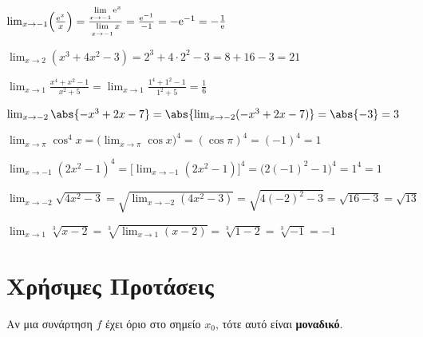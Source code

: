 \begin{example}
  $ \lim_{x \to -1} \Bigl(\frac{\mathrm{e}^{x}}{x}\Bigr) = \frac{\lim\limits_{x \to -1}
  \mathrm{e}^{x}}{\lim\limits_{x \to -1}x} = \frac{\mathrm{e}^{-1}}{-1} = -
  \mathrm{e}^{-1} = - \frac{1}{\mathrm{e}} $  
\end{example}

\begin{example}
  $ \lim_{x \to 2} (x^{3}+4x^{2}-3) = 2^{3}+ 4 \cdot 2^{2} -3 = 8+16-3 = 21 $  
\end{example}

\begin{example}
  $ \lim_{x \to 1} \frac{x^{4}+x^{2}-1}{x^{2}+5} = \lim_{x \to 1}
  \frac{1^{4}+1^{2}-1}{1^{2}+5} = \frac{1}{6} $
\end{example}

\begin{example}
  $ \lim_{x \to -2} \abs{-x^{3}+2x-7} = \abs{\lim_{x \to -2} (-x^{3}+2x-7)} = \abs{-3}
  = 3$ 
\end{example}

\begin{example}
  $ \lim_{x \to \pi} \cos^{4}{x} = \bigl(\lim_{x \to \pi} \cos{x} \bigr)^{4} =
  (\cos{\pi} )^{4} = (-1)^{4}=1 $
\end{example}

\begin{example} 
  $\lim_{x \to -1} (2x^{2}-1)^{4} = \bigl[\lim_{x \to -1}
  (2x^{2}-1)\bigr]^{4} = \bigl(2(-1)^{2}-1\bigr)^{4} = 1^{4} = 1 $ 
\end{example}

\begin{example}
  $ \lim_{x \to -2} \sqrt{4x^{2}-3} = \sqrt{\lim_{x \to -2} (4x^{2}-3)} =
  \sqrt{4(-2)^{2}-3} = \sqrt{16-3} = \sqrt{13} $    
\end{example}

\begin{example}
  $ \lim_{x \to 1} \sqrt[3]{x-2} = \sqrt[3]{\lim_{x \to 1} (x-2)} = \sqrt[3]{1-2} =
  \sqrt[3]{-1} = -1 $
\end{example}


\section*{Χρήσιμες Προτάσεις}

\begin{prop}
  Αν μια συνάρτηση $ f $ έχει όριο στο σημείο $ x_{0} $, τότε αυτό είναι
  \textbf{μοναδικό}.
\end{prop}

